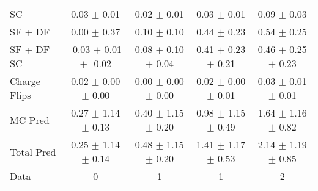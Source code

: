 \begin{tabular}{l|cccc}
                                 SC &  0.03 $\pm$  0.01 &  0.02 $\pm$  0.01 &  0.03 $\pm$  0.01 &  0.09 $\pm$  0.03 \\
                            SF + DF &  0.00 $\pm$  0.37 &  0.10 $\pm$  0.10 &  0.44 $\pm$  0.23 &  0.54 $\pm$  0.25 \\
\hline
                       SF + DF - SC & -0.03 $\pm$  0.01 $\pm$ -0.02 &  0.08 $\pm$  0.10 $\pm$  0.04 &  0.41 $\pm$  0.23 $\pm$  0.21 &  0.46 $\pm$  0.25 $\pm$  0.23 \\
\hline\hline
                       Charge Flips &  0.02 $\pm$  0.00 $\pm$  0.00 &  0.00 $\pm$  0.00 $\pm$  0.00 &  0.02 $\pm$  0.00 $\pm$  0.01 &  0.03 $\pm$  0.01 $\pm$  0.01 \\
\hline
                            MC Pred &  0.27 $\pm$  1.14 $\pm$  0.13 &  0.40 $\pm$  1.15 $\pm$  0.20 &  0.98 $\pm$  1.15 $\pm$  0.49 &  1.64 $\pm$  1.16 $\pm$  0.82 \\
\hline
                         Total Pred &  0.25 $\pm$  1.14 $\pm$  0.14 &  0.48 $\pm$  1.15 $\pm$  0.20 &  1.41 $\pm$  1.17 $\pm$  0.53 &  2.14 $\pm$  1.19 $\pm$  0.85 \\
\hline\hline
                               Data &     0 &     1 &     1 &     2 \\
\hline\hline
\end{tabular}

